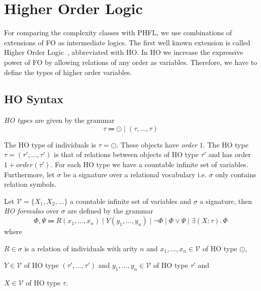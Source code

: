 

\section{Higher Order Logic}\label{sec:higherOrderLogic}

For comparing the complexity classes with PHFL, we use combinations of extensions of FO as intermediate logics. The first well
known extension is called Higher Order Logic~\cite{vanBenthem2001higher}, abbreviated with HO. In HO we
increase the expressive power of FO by allowing relations of any order as variables. Therefore, we have to define the
types of higher order variables.

\subsection{HO Syntax}\label{subsec:hoSyntax}

\begin{definition}
    \emph{HO types} are given by the grammar
    \[ \tau \Coloneqq \odot \mid (\tau, \dots, \tau) \]
\end{definition}

The HO type of individuals is $\tau = \odot$. These objects have \textit{order} $1$. The HO type $\tau = (\tau',
\dots, \tau')$ is that of relations between objects of HO type $\tau'$ and has order $1 + order(\tau')$. For
each HO type we have a countable infinite set of variables. Furthermore, let $\sigma$ be a signature over a
relational vocabulary i.e. $\sigma$ only contains relation symbols.

\begin{definition}
    Let $\mathcal{V} = \{X_1, X_2, \dots \}$ a countable infinite set of variables and $\sigma$ a signature, then \emph{HO
    formulas} over $\sigma$ are defined by the grammar
    \[\Phi, \Psi \Coloneqq R(x_1, \dots, x_n) \mid Y(y_1, \dots, y_n) \mid \neg \Phi \mid \Phi \vee \Psi \mid \exists
    (X \colon \tau).\,\Phi\]
    where
    \begin{compactitem}
        \item $R \in \sigma$ is a relation of individuals with arity $n$ and $x_1, \dots, x_n \in \mathcal{V}$ of HO
        type $\odot$,
        \item $Y \in \mathcal{V}$ of HO type $(\tau', \dots, \tau')$ and $y_1, \dots, y_n \in \mathcal{V}$ of HO type
        $\tau'$ and
        \item $X \in \mathcal{V}$ of HO type $\tau$.
    \end{compactitem}
\end{definition}

